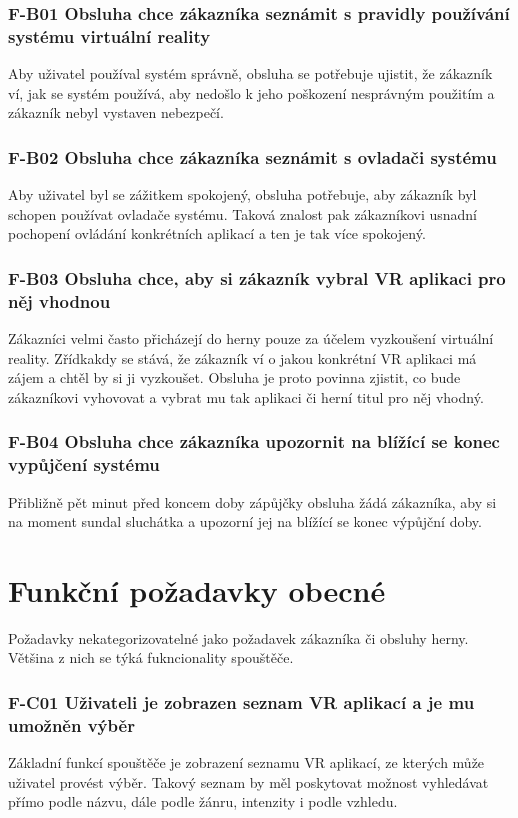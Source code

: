 \subsubsection*{F-B01 Obsluha chce zákazníka seznámit s pravidly používání
systému virtuální reality}
Aby uživatel používal systém správně, obsluha se potřebuje ujistit, že
zákazník ví, jak se systém používá, aby nedošlo k jeho poškození
nesprávným použitím a zákazník nebyl vystaven nebezpečí.

\subsubsection*{F-B02 Obsluha chce zákazníka seznámit s ovladači systému}
Aby uživatel byl se zážitkem spokojený, obsluha potřebuje, aby zákazník
byl schopen používat ovladače systému. Taková znalost pak zákazníkovi
usnadní pochopení ovládání konkrétních aplikací a ten je tak více
spokojený.

\subsubsection*{F-B03 Obsluha chce, aby si zákazník vybral VR aplikaci pro něj
vhodnou}
Zákazníci velmi často přicházejí do herny pouze za účelem vyzkoušení
virtuální reality. Zřídkakdy se stává, že zákazník ví o jakou
konkrétní VR aplikaci má zájem a chtěl by si ji vyzkoušet. Obsluha je proto
povinna zjistit, co bude zákazníkovi vyhovovat a vybrat mu tak 
aplikaci či herní titul pro něj vhodný.

\subsubsection*{F-B04 Obsluha chce zákazníka upozornit na blížící se konec
vypůjčení systému}
Přibližně pět minut před koncem doby zápůjčky obsluha žádá zákazníka,
aby si na moment sundal sluchátka a upozorní jej na blížící se konec výpůjční doby.

\newpage

\section{Funkční požadavky
obecné}\label{funkux10dnuxed-poux17eadavky-obecnuxe9}

Požadavky nekategorizovatelné jako požadavek zákazníka či obsluhy
herny. Většina z nich se týká fukncionality spouštěče.

\subsubsection*{F-C01 Uživateli je zobrazen seznam VR aplikací a je mu umožněn
výběr}
Základní funkcí spouštěče je zobrazení seznamu VR aplikací, ze kterých
může uživatel provést výběr. Takový seznam by měl poskytovat možnost
vyhledávat přímo podle názvu, dále podle žánru, intenzity i podle
vzhledu.

